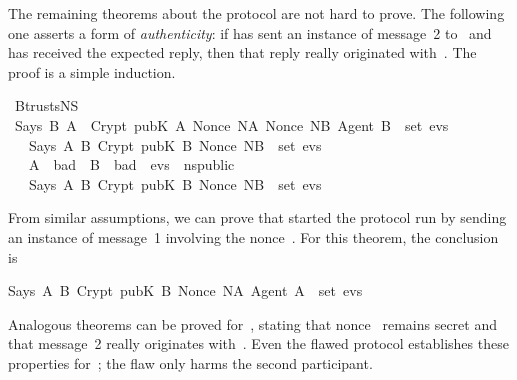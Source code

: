 \begin{isabellebody}
\begin{isamarkuptxt}
The remaining theorems about the protocol are not hard to prove.  The
following one asserts a form of \emph{authenticity}: if
 has sent an instance of message~2 to~ and has received the
expected reply, then that reply really originated with~.  The
proof is a simple induction.%
\end{isamarkuptxt}%
\isamarkuptrue%
%
\endisatagproof
{\isafoldproof}%
%
\isadelimproof
%
\endisadelimproof
%
\isadelimproof
%
\endisadelimproof
%
\isatagproof
%
\endisatagproof
{\isafoldproof}%
%
\isadelimproof
%
\endisadelimproof
{}\isamarkupfalse%
\ B{\isacharunderscore}trusts{\isacharunderscore}NS{}{\isacharcolon}\isanewline
\ {\isachardoublequoteopen}{\isasymlbrakk}Says\ B\ A\ \ {\isacharparenleft}Crypt\ {\isacharparenleft}pubK\ A{\isacharparenright}\ {\isasymlbrace}Nonce\ NA{\isacharcomma}\ Nonce\ NB{\isacharcomma}\ Agent\ B{\isasymrbrace}{\isacharparenright}\ {\isasymin}\ set\ evs{\isacharsemicolon}\isanewline
\ \ \ Says\ A{\isacharprime}\ B\ {\isacharparenleft}Crypt\ {\isacharparenleft}pubK\ B{\isacharparenright}\ {\isacharparenleft}Nonce\ NB{\isacharparenright}{\isacharparenright}\ {\isasymin}\ set\ evs{\isacharsemicolon}\isanewline
\ \ \ A\ {\isasymnotin}\ bad{\isacharsemicolon}\ \ B\ {\isasymnotin}\ bad{\isacharsemicolon}\ \ evs\ {\isasymin}\ ns{\isacharunderscore}public{\isasymrbrakk}\isanewline
\ \ {\isasymLongrightarrow}\ Says\ A\ B\ {\isacharparenleft}Crypt\ {\isacharparenleft}pubK\ B{\isacharparenright}\ {\isacharparenleft}Nonce\ NB{\isacharparenright}{\isacharparenright}\ {\isasymin}\ set\ evs{\isachardoublequoteclose}%
\isadelimproof
%
\endisadelimproof
%
\isatagproof
%
\endisatagproof
{\isafoldproof}%
%
\isadelimproof
%
\endisadelimproof
%
\isadelimproof
%
\endisadelimproof
%
\isatagproof
%
\endisatagproof
{\isafoldproof}%
%
\isadelimproof
%
\endisadelimproof
%
\begin{isamarkuptext}%
From similar assumptions, we can prove that  started the protocol
run by sending an instance of message~1 involving the nonce~\@. 
For this theorem, the conclusion is 
\begin{isabelle}%
Says\ A\ B\ {\isacharparenleft}Crypt\ {\isacharparenleft}pubK\ B{\isacharparenright}\ {\isasymlbrace}Nonce\ NA{\isacharcomma}\ Agent\ A{\isasymrbrace}{\isacharparenright}\ {\isasymin}\ set\ evs%
\end{isabelle}
Analogous theorems can be proved for~, stating that nonce~
remains secret and that message~2 really originates with~.  Even the
flawed protocol establishes these properties for~;
the flaw only harms the second participant.


\end{isamarkuptext}
\end{isabellebody}
